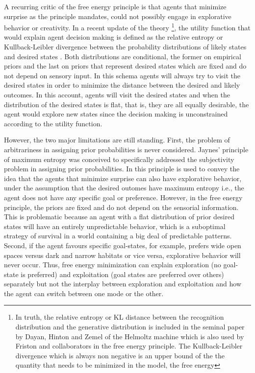 \documentclass[11pt, onecolumn]{article}
\begin{document}
A recurring critic of the free energy principle is that agents that minimize surprise as the principle mandates, could not possibly engage in explorative  behavior or creativity. In a recent update of the theory \footnote{In truth, the relative entropy or KL distance between the recognition distribution and the generative distribution is included in the seminal paper by Dayan, Hinton and Zemel 
of the Helmoltz machine \citep{dayan_helmholtz_1995} which is also used by Friston and collaborators in the free energy principle. The Kullback-Leibler divergence which is always non negative is an upper
bound of the the quantity that needs to be minimized in the model, the free energy}, the utility function that would explain agent decision making is defined as the relative entropy or Kullback-Leibler divergence between the probability distributions of likely states and desired states \citep{schwartenbeck_exploration_2013}. Both distributions are conditional, the former on empirical priors and the last on priors that represent desired states which are fixed and do not depend on sensory input. In this schema agents will always try to visit the desired states in order to minimize the distance between the desired and likely outcomes. In this account, agents will visit the desired states and when the distribution of the desired states is flat, that is, they are all equally desirable, the agent would explore new states since the decision making is unconstrained according to the utility  function.

However, the two major limitations are still standing. First, the problem of arbitrariness in assigning prior probabilities is 
never considered. Jaynes' \citep{Jaynes68priorprobabilities} principle of maximum entropy was conceived to specifically addressed the subjectivity problem in assigning prior probabilities. In \citep{schwartenbeck_exploration_2013} this principle is used to convey the idea that the agents that minimize surprise can also have explorative behavior, under the assumption that the desired outomes have maximum entropy i.e., the agent does not have any specific goal or preference. However, in the free energy principle, the priors are fixed and do not depend on the sensorial information. This is problematic because an agent with a flat distribution of prior desired states will have an entirely unpredictable behavior, which is a suboptimal strategy of survival in a world containing a big deal of predictable patterns. Second, if the agent favours specific goal-states, for example, prefers wide open spaces versus dark and narrow habitats or vice versa, explorative behavior will never occur. Thus, free energy minimization can explain exploration (no goal-state is preferred) and exploitation (goal states are preferred over others) separately but not the interplay between exploration and exploitation and how the agent can switch between one mode or the other.
\end{document}
